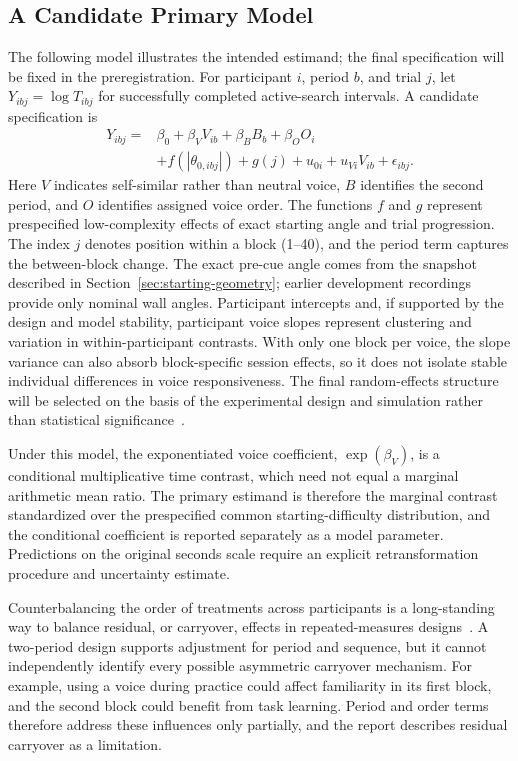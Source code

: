 \subsection{A Candidate Primary Model}
The following model illustrates the intended estimand; the final specification will be fixed in the preregistration. For participant $i$, period $b$, and trial $j$, let $Y_{ibj}=\log T_{ibj}$ for successfully completed active-search intervals. A candidate specification is
\begin{align}
Y_{ibj}={}&\beta_0+\beta_V V_{ib}+\beta_B B_b+\beta_O O_i\\
&+f(|\theta_{0,ibj}|)+g(j)+u_{0i}+u_{Vi}V_{ib}+\epsilon_{ibj}.
\end{align}
Here $V$ indicates self-similar rather than neutral voice, $B$ identifies the second period, and $O$ identifies assigned voice order. The functions $f$ and $g$ represent prespecified low-complexity effects of exact starting angle and trial progression. The index $j$ denotes position within a block (1--40), and the period term captures the between-block change. The exact pre-cue angle comes from the snapshot described in Section~\ref{sec:starting-geometry}; earlier development recordings provide only nominal wall angles. Participant intercepts and, if supported by the design and model stability, participant voice slopes represent clustering and variation in within-participant contrasts. With only one block per voice, the slope variance can also absorb block-specific session effects, so it does not isolate stable individual differences in voice responsiveness. The final random-effects structure will be selected on the basis of the experimental design and simulation rather than statistical significance~\cite{barr2013random}.

Under this model, the exponentiated voice coefficient, $\exp(\beta_V)$, is a conditional multiplicative time contrast, which need not equal a marginal arithmetic mean ratio. The primary estimand is therefore the marginal contrast standardized over the prespecified common starting-difficulty distribution, and the conditional coefficient is reported separately as a model parameter. Predictions on the original seconds scale require an explicit retransformation procedure and uncertainty estimate.

Counterbalancing the order of treatments across participants is a long-standing way to balance residual, or carryover, effects in repeated-measures designs~\cite{williams1949residual}. A two-period design supports adjustment for period and sequence, but it cannot independently identify every possible asymmetric carryover mechanism. For example, using a voice during practice could affect familiarity in its first block, and the second block could benefit from task learning. Period and order terms therefore address these influences only partially, and the report describes residual carryover as a limitation.

